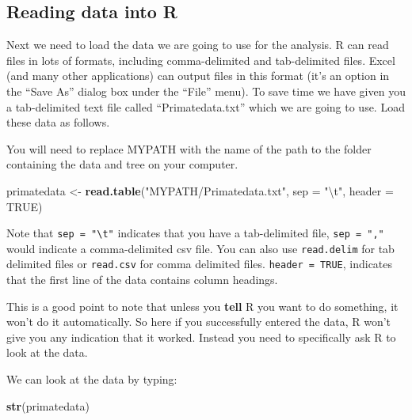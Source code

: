 \documentclass[11pt]{article}
\newcommand{\KeywordTok}[1]{\textcolor[rgb]{0.13,0.29,0.53}{\textbf{{#1}}}}
\newcommand{\DataTypeTok}[1]{\textcolor[rgb]{0.13,0.29,0.53}{{#1}}}
\newcommand{\CharTok}[1]{\textcolor[rgb]{0.31,0.60,0.02}{{#1}}}
\newcommand{\StringTok}[1]{\textcolor[rgb]{0.31,0.60,0.02}{{#1}}}
\newcommand{\OtherTok}[1]{\textcolor[rgb]{0.56,0.35,0.01}{{#1}}}
\newcommand{\NormalTok}[1]{{#1}}
\begin{document}
\subsection{Reading data into R}

Next we need to load the data we are going to use for the analysis. R
can read files in lots of formats, including comma-delimited and
tab-delimited files. Excel (and many other applications) can output
files in this format (it's an option in the ``Save As'' dialog box
under the ``File'' menu). To save time we have given you a tab-delimited
text file called ``Primatedata.txt'' which we are going to use. Load
these data as follows. 

\begin{framed}
You will need to replace MYPATH with the name of the path to the folder 
containing the data and tree on your computer.
\end{framed}

\begin{snugshade}
\begin{Highlighting}[]
\NormalTok{primatedata <-}\StringTok{ }\KeywordTok{read.table}\NormalTok{(}\StringTok{"MYPATH/Primatedata.txt"}\NormalTok{, }\DataTypeTok{sep =} \StringTok{"}\CharTok{\textbackslash{}t}\StringTok{"}\NormalTok{, }
                          \DataTypeTok{header =} \OtherTok{TRUE}\NormalTok{)}
\end{Highlighting}
\end{snugshade}

Note that \texttt{sep = "\textbackslash{}t"} indicates that you have a tab-delimited file, 
\texttt{sep = ","}  would indicate a comma-delimited csv file. You can also use
\texttt{read.delim} for tab delimited files or \texttt{read.csv} for comma delimited
files. \texttt{header = TRUE}, indicates that the first line of the data contains
column headings.

This is a good point to note that unless you \textbf{tell} R you want to
do something, it won't do it automatically. So here if you successfully
entered the data, R won't give you any indication that it worked.
Instead you need to specifically ask R to look at the data.

We can look at the data by typing:

\begin{snugshade}
\begin{Highlighting}[]
\KeywordTok{str}\NormalTok{(primatedata)}
\end{Highlighting}
\end{snugshade}
\end{document}
